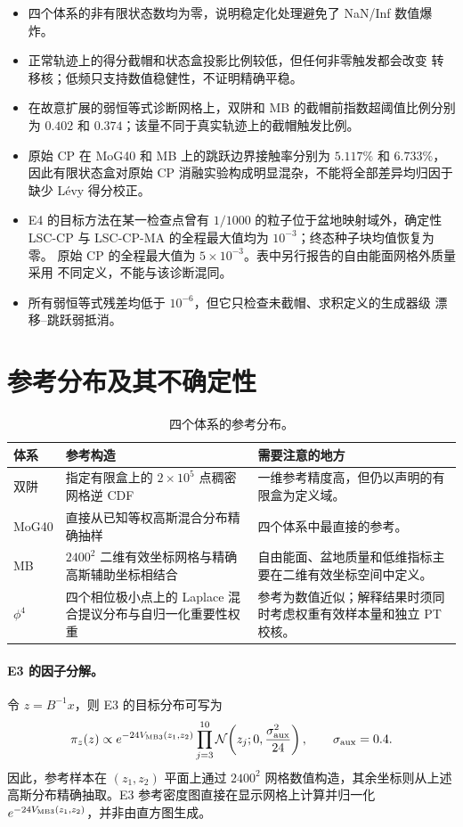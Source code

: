 \documentclass[11pt,a4paper]{article}
\begin{document}
\begin{itemize}
 \item 四个体系的非有限状态数均为零，说明稳定化处理避免了 NaN/Inf 数值爆炸。
 \item 正常轨迹上的得分截帽和状态盒投影比例较低，但任何非零触发都会改变
 转移核；低频只支持数值稳健性，不证明精确平稳。
 \item 在故意扩展的弱恒等式诊断网格上，双阱和 MB 的截帽前指数超阈值比例分别为
 $0.402$ 和 $0.374$；该量不同于真实轨迹上的截帽触发比例。
 \item 原始 CP 在 MoG40 和 MB 上的跳跃边界接触率分别为 $5.117\%$ 和
 $6.733\%$，因此有限状态盒对原始 CP 消融实验构成明显混杂，不能将全部差异均归因于
 缺少 Lévy 得分校正。
 \item E4 的目标方法在某一检查点曾有 $1/1000$ 的粒子位于盆地映射域外，确定性
 LSC-CP 与 LSC-CP-MA 的全程最大值均为 $10^{-3}$；终态种子块均值恢复为零。
 原始 CP 的全程最大值为 $5\times10^{-3}$。表中另行报告的自由能面网格外质量采用
 不同定义，不能与该诊断混同。
 \item 所有弱恒等式残差均低于 $10^{-6}$，但它只检查未截帽、求积定义的生成器级
 漂移--跳跃弱抵消。
\end{itemize}

\section{参考分布及其不确定性}

\begin{table}[H]
\centering
\small
\begin{tabularx}{\textwidth}{L{2.3cm}L{5.1cm}Y}
\toprule
体系 & 参考构造 & 需要注意的地方 \\
\midrule
双阱 &
指定有限盒上的 $2\times10^5$ 点稠密网格逆 CDF &
一维参考精度高，但仍以声明的有限盒为定义域。 \\
MoG40 &
直接从已知等权高斯混合分布精确抽样 &
四个体系中最直接的参考。 \\
MB &
$2400^2$ 二维有效坐标网格与精确高斯辅助坐标相结合 &
自由能面、盆地质量和低维指标主要在二维有效坐标空间中定义。 \\
$\phi^4$ &
四个相位极小点上的 Laplace 混合提议分布与自归一化重要性权重 &
参考为数值近似；解释结果时须同时考虑权重有效样本量和独立 PT 校核。 \\
\bottomrule
\end{tabularx}
\caption{四个体系的参考分布。}
\end{table}

\paragraph{E3 的因子分解。}
令 $z=B^{-1}x$，则 E3 的目标分布可写为
\begin{equation}
 \pi_z(z)\propto e^{-24V_{\rm MB3}(z_1,z_2)}
 \prod_{j=3}^{10}
 \mathcal N\!\left(z_j;0,\frac{\sigma_{\rm aux}^2}{24}\right),
 \qquad \sigma_{\rm aux}=0.4 .
\end{equation}
因此，参考样本在 $(z_1,z_2)$ 平面上通过 $2400^2$ 网格数值构造，其余坐标则从上述
高斯分布精确抽取。E3 参考密度图直接在显示网格上计算并归一化
$e^{-24V_{\rm MB3}(z_1,z_2)}$，并非由直方图生成。
\end{document}
